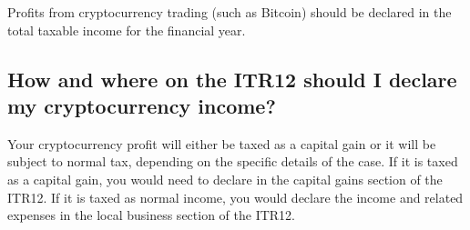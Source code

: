 Profits from cryptocurrency trading (such as Bitcoin) should be declared in the total taxable income for the financial year.

\subsection{How and where on the ITR12 should I declare my cryptocurrency income?}

Your cryptocurrency profit will either be taxed as a capital gain or it will be subject to normal tax, depending on the specific details of the case. If it is taxed as a capital gain, you would need to declare in the capital gains section of the ITR12. If it is taxed as normal income, you would declare the income and related expenses in the local business section of the ITR12. 
